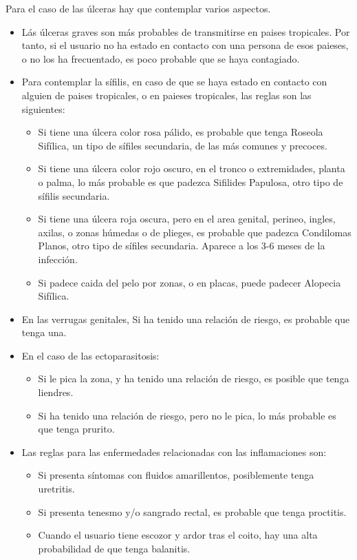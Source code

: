 Para el caso de las úlceras hay que contemplar varios aspectos.
\begin{itemize}
  \item Lás úlceras graves son más probables de transmitirse en paises tropicales. Por tanto, si el usuario no ha estado en contacto con una persona de esos paieses, o no los ha frecuentado, es poco probable que se haya contagiado.
  \item Para contemplar la sífilis, en caso de que se haya estado en contacto con alguien de paises tropicales, o en paieses tropicales, las reglas son las siguientes:
  \begin{itemize}
    \item Si tiene una úlcera color rosa pálido, es probable que tenga Roseola Sifílica, un tipo de sífiles secundaria, de las más comunes y precoces.
    \item Si tiene una úlcera color rojo oscuro, en el tronco o extremidades, planta o palma, lo más probable es que padezca Sifilides Papulosa, otro tipo de sífilis secundaria.
    \item Si tiene una úlcera roja oscura, pero en el area genital, perineo, ingles, axilas, o zonas húmedas o de plieges, es probable que padezca Condilomas Planos, otro tipo de sífiles secundaria. Aparece a los 3-6 meses de la infección.
    \item Si padece caida del pelo por zonas, o en placas, puede padecer Alopecia Sifílica.
  \end{itemize}
  \item En las verrugas genitales, Si ha tenido una relación de riesgo, es probable que tenga una.
  \item En el caso de las ectoparasitosis:
  \begin{itemize}
    \item Si le pica la zona, y ha tenido una relación de riesgo, es posible que tenga liendres.
    \item Si ha tenido una relación de riesgo, pero no le pica, lo más probable es que tenga prurito.
  \end{itemize}
  \item Las reglas para las enfermedades relacionadas con las inflamaciones son:
  \begin{itemize}
    \item Si presenta síntomas con fluidos amarillentos, posiblemente tenga uretritis.
    \item Si presenta tenesmo y/o sangrado rectal, es probable que tenga proctitis.
    \item Cuando el usuario tiene escozor y ardor tras el coito, hay una alta probabilidad de que tenga balanitis.
  \end{itemize}
\end{itemize}
